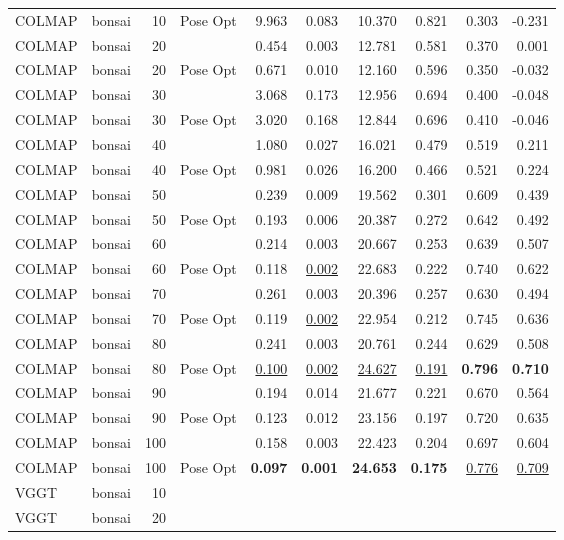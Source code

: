 \begin{table}[H]
\begin{tabular}{llrlrrrrrr}
COLMAP & bonsai & 10 & Pose Opt & 9.963 & 0.083 & 10.370 & 0.821 & 0.303 & -0.231 \\
COLMAP & bonsai & 20 &  & 0.454 & 0.003 & 12.781 & 0.581 & 0.370 & 0.001 \\
COLMAP & bonsai & 20 & Pose Opt & 0.671 & 0.010 & 12.160 & 0.596 & 0.350 & -0.032 \\
COLMAP & bonsai & 30 &  & 3.068 & 0.173 & 12.956 & 0.694 & 0.400 & -0.048 \\
COLMAP & bonsai & 30 & Pose Opt & 3.020 & 0.168 & 12.844 & 0.696 & 0.410 & -0.046 \\
COLMAP & bonsai & 40 &  & 1.080 & 0.027 & 16.021 & 0.479 & 0.519 & 0.211 \\
COLMAP & bonsai & 40 & Pose Opt & 0.981 & 0.026 & 16.200 & 0.466 & 0.521 & 0.224 \\
COLMAP & bonsai & 50 &  & 0.239 & 0.009 & 19.562 & 0.301 & 0.609 & 0.439 \\
COLMAP & bonsai & 50 & Pose Opt & 0.193 & 0.006 & 20.387 & 0.272 & 0.642 & 0.492 \\
COLMAP & bonsai & 60 &  & 0.214 & 0.003 & 20.667 & 0.253 & 0.639 & 0.507 \\
COLMAP & bonsai & 60 & Pose Opt & 0.118 & \underline{0.002} & 22.683 & 0.222 & 0.740 & 0.622 \\
COLMAP & bonsai & 70 &  & 0.261 & 0.003 & 20.396 & 0.257 & 0.630 & 0.494 \\
COLMAP & bonsai & 70 & Pose Opt & 0.119 & \underline{0.002} & 22.954 & 0.212 & 0.745 & 0.636 \\
COLMAP & bonsai & 80 &  & 0.241 & 0.003 & 20.761 & 0.244 & 0.629 & 0.508 \\
COLMAP & bonsai & 80 & Pose Opt & \underline{0.100} & \underline{0.002} & \underline{24.627} & \underline{0.191} & \textbf{0.796} & \textbf{0.710} \\
COLMAP & bonsai & 90 &  & 0.194 & 0.014 & 21.677 & 0.221 & 0.670 & 0.564 \\
COLMAP & bonsai & 90 & Pose Opt & 0.123 & 0.012 & 23.156 & 0.197 & 0.720 & 0.635 \\
COLMAP & bonsai & 100 &  & 0.158 & 0.003 & 22.423 & 0.204 & 0.697 & 0.604 \\
COLMAP & bonsai & 100 & Pose Opt & \textbf{0.097} & \textbf{0.001} & \textbf{24.653} & \textbf{0.175} & \underline{0.776} & \underline{0.709} \\
VGGT & bonsai & 10 &  &  &  &  &  &  &  \\
VGGT & bonsai & 20 &  &  &  &  &  &  &  \\

\end{tabular}
\end{table}

